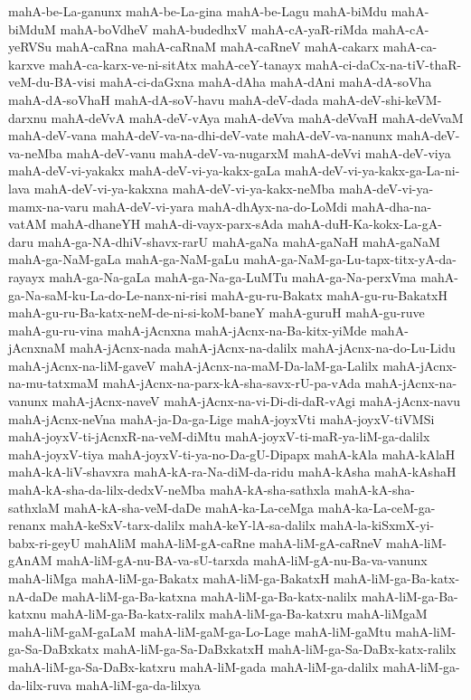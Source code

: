 {mahA-be-La-ganunx
mahA-be-La-gina
mahA-be-Lagu
mahA-biMdu
mahA-biMduM
mahA-boVdheV
mahA-budedhxV
mahA-cA-yaR-riMda
mahA-cA-yeRVSu
mahA-caRna
mahA-caRnaM
mahA-caRneV
mahA-cakarx
mahA-ca-karxve
mahA-ca-karx-ve-ni-sitAtx
mahA-ceY-tanayx
mahA-ci-daCx-na-tiV-thaR-veM-du-BA-visi
mahA-ci-daGxna
mahA-dAha
mahA-dAni
mahA-dA-soVha
mahA-dA-soVhaH
mahA-dA-soV-havu
mahA-deV-dada
mahA-deV-shi-keVM-darxnu
mahA-deVvA
mahA-deV-vAya
mahA-deVva
mahA-deVvaH
mahA-deVvaM
mahA-deV-vana
mahA-deV-va-na-dhi-deV-vate
mahA-deV-va-nanunx
mahA-deV-va-neMba
mahA-deV-vanu
mahA-deV-va-nugarxM
mahA-deVvi
mahA-deV-viya
mahA-deV-vi-yakakx
mahA-deV-vi-ya-kakx-gaLa
mahA-deV-vi-ya-kakx-ga-La-ni-lava
mahA-deV-vi-ya-kakxna
mahA-deV-vi-ya-kakx-neMba
mahA-deV-vi-ya-mamx-na-varu
mahA-deV-vi-yara
mahA-dhAyx-na-do-LoMdi
mahA-dha-na-vatAM
mahA-dhaneYH
mahA-di-vayx-parx-sAda
mahA-duH-Ka-kokx-La-gA-daru
mahA-ga-NA-dhiV-shavx-rarU
mahA-gaNa
mahA-gaNaH
mahA-gaNaM
mahA-ga-NaM-gaLa
mahA-ga-NaM-gaLu
mahA-ga-NaM-ga-Lu-tapx-titx-yA-da-rayayx
mahA-ga-Na-gaLa
mahA-ga-Na-ga-LuMTu
mahA-ga-Na-perxVma
mahA-ga-Na-saM-ku-La-do-Le-nanx-ni-risi
mahA-gu-ru-Bakatx
mahA-gu-ru-BakatxH
mahA-gu-ru-Ba-katx-neM-de-ni-si-koM-baneY
mahA-guruH
mahA-gu-ruve
mahA-gu-ru-vina
mahA-jAcnxna
mahA-jAcnx-na-Ba-kitx-yiMde
mahA-jAcnxnaM
mahA-jAcnx-nada
mahA-jAcnx-na-dalilx
mahA-jAcnx-na-do-Lu-Lidu
mahA-jAcnx-na-liM-gaveV
mahA-jAcnx-na-maM-Da-laM-ga-Lalilx
mahA-jAcnx-na-mu-tatxmaM
mahA-jAcnx-na-parx-kA-sha-savx-rU-pa-vAda
mahA-jAcnx-na-vanunx
mahA-jAcnx-naveV
mahA-jAcnx-na-vi-Di-di-daR-vAgi
mahA-jAcnx-navu
mahA-jAcnx-neVna
mahA-ja-Da-ga-Lige
mahA-joyxVti
mahA-joyxV-tiVMSi
mahA-joyxV-ti-jAcnxR-na-veM-diMtu
mahA-joyxV-ti-maR-ya-liM-ga-dalilx
mahA-joyxV-tiya
mahA-joyxV-ti-ya-no-Da-gU-Dipapx
mahA-kAla
mahA-kAlaH
mahA-kA-liV-shavxra
mahA-kA-ra-Na-diM-da-ridu
mahA-kAsha
mahA-kAshaH
mahA-kA-sha-da-lilx-dedxV-neMba
mahA-kA-sha-sathxla
mahA-kA-sha-sathxlaM
mahA-kA-sha-veM-daDe
mahA-ka-La-ceMga
mahA-ka-La-ceM-ga-renanx
mahA-keSxV-tarx-dalilx
mahA-keY-lA-sa-dalilx
mahA-la-kiSxmX-yi-babx-ri-geyU
mahAliM
mahA-liM-gA-caRne
mahA-liM-gA-caRneV
mahA-liM-gAnAM
mahA-liM-gA-nu-BA-va-sU-tarxda
mahA-liM-gA-nu-Ba-va-vanunx
mahA-liMga
mahA-liM-ga-Bakatx
mahA-liM-ga-BakatxH
mahA-liM-ga-Ba-katx-nA-daDe
mahA-liM-ga-Ba-katxna
mahA-liM-ga-Ba-katx-nalilx
mahA-liM-ga-Ba-katxnu
mahA-liM-ga-Ba-katx-ralilx
mahA-liM-ga-Ba-katxru
mahA-liMgaM
mahA-liM-gaM-gaLaM
mahA-liM-gaM-ga-Lo-Lage
mahA-liM-gaMtu
mahA-liM-ga-Sa-DaBxkatx
mahA-liM-ga-Sa-DaBxkatxH
mahA-liM-ga-Sa-DaBx-katx-ralilx
mahA-liM-ga-Sa-DaBx-katxru
mahA-liM-gada
mahA-liM-ga-dalilx
mahA-liM-ga-da-lilx-ruva
mahA-liM-ga-da-lilxya
}
